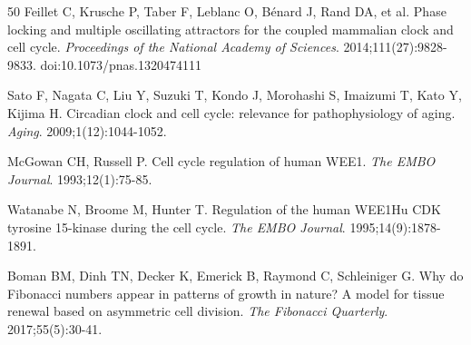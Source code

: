 \documentclass[11pt,a4paper]{article}
\begin{document}
\begin{thebibliography}{50}
Feillet C, Krusche P, Taber F, Leblanc O, B{\'e}nard J, Rand DA, et al.
Phase locking and multiple oscillating attractors for the coupled mammalian clock and cell cycle.
\textit{Proceedings of the National Academy of Sciences}. 2014;111(27):9828-9833. doi:10.1073/pnas.1320474111

Sato F, Nagata C, Liu Y, Suzuki T, Kondo J, Morohashi S, Imaizumi T, Kato Y, Kijima H.
Circadian clock and cell cycle: relevance for pathophysiology of aging.
\textit{Aging}. 2009;1(12):1044-1052.

McGowan CH, Russell P.
Cell cycle regulation of human WEE1.
\textit{The EMBO Journal}. 1993;12(1):75-85.

Watanabe N, Broome M, Hunter T.
Regulation of the human WEE1Hu CDK tyrosine 15-kinase during the cell cycle.
\textit{The EMBO Journal}. 1995;14(9):1878-1891.

Boman BM, Dinh TN, Decker K, Emerick B, Raymond C, Schleiniger G.
Why do Fibonacci numbers appear in patterns of growth in nature? A model for tissue renewal based on asymmetric cell division.
\textit{The Fibonacci Quarterly}. 2017;55(5):30-41.

\end{thebibliography}
\end{document}
